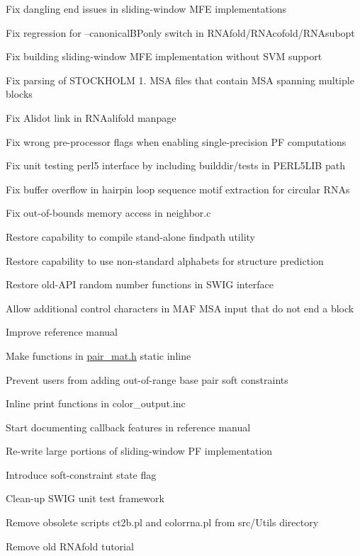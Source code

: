 \begin{DoxyItemize}
\item Fix dangling end issues in sliding-\/window M\+FE implementations
\item Fix regression for --canonical\+B\+Ponly switch in R\+N\+Afold/\+R\+N\+Acofold/\+R\+N\+Asubopt
\item Fix building sliding-\/window M\+FE implementation without S\+VM support
\item Fix parsing of S\+T\+O\+C\+K\+H\+O\+LM 1. M\+SA files that contain M\+SA spanning multiple blocks
\item Fix Alidot link in R\+N\+Aalifold manpage
\item Fix wrong pre-\/processor flags when enabling single-\/precision PF computations
\item Fix unit testing perl5 interface by including builddir/tests in P\+E\+R\+L5\+L\+IB path
\item Fix buffer overflow in hairpin loop sequence motif extraction for circular R\+N\+As
\item Fix out-\/of-\/bounds memory access in neighbor.\+c
\item Restore capability to compile stand-\/alone findpath utility
\item Restore capability to use non-\/standard alphabets for structure prediction
\item Restore old-\/\+A\+PI random number functions in S\+W\+IG interface
\item Allow additional control characters in M\+AF M\+SA input that do not end a block
\item Improve reference manual
\item Make functions in \mbox{\hyperlink{pair__mat_8h_source}{pair\+\_\+mat.\+h}} static inline
\item Prevent users from adding out-\/of-\/range base pair soft constraints
\item Inline print functions in color\+\_\+output.\+inc
\item Start documenting callback features in reference manual
\item Re-\/write large portions of sliding-\/window PF implementation
\item Introduce soft-\/constraint state flag
\item Clean-\/up S\+W\+IG unit test framework
\item Remove obsolete scripts ct2b.\+pl and colorrna.\+pl from src/\+Utils directory
\item Remove old R\+N\+Afold tutorial
\end{DoxyItemize}

